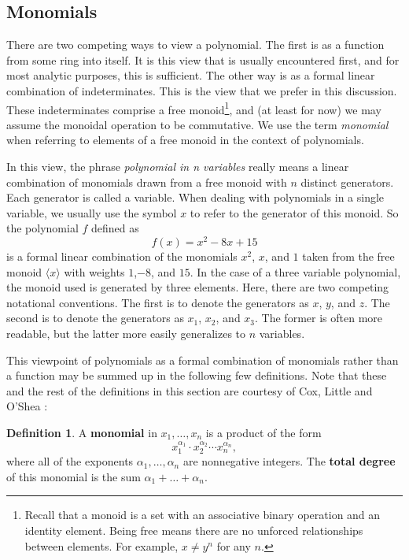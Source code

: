 \documentclass[MS, xcolor=dvipsnames]{wfuthesis}
\theoremstyle{definition}
\newtheorem{definition}[theorem]{Definition}
\begin{document}
\subsection{Monomials}
There are two competing ways to view a polynomial. The first is as a function from some ring into itself. It is this view that is usually encountered first, and for most analytic purposes, this is sufficient. The other way is as a formal linear combination of indeterminates. This is the view that we prefer in this discussion. These indeterminates comprise a free monoid\footnote{Recall that a monoid is a set with an associative binary operation and an identity element. Being free means there are no unforced relationships between elements. For example, $x \ne y^n$ for any $n$.}, and (at least for now) we may assume the monoidal operation to be commutative. We use the term \textit{monomial} when referring to elements of a free monoid in the context of polynomials. \par 
In this view, the phrase \textit{polynomial in n variables} really means a linear combination of monomials drawn from a free monoid with $n$ distinct generators. Each generator is called a variable. When dealing with polynomials in a single variable, we usually use the symbol $x$ to refer to the generator of this monoid. So the polynomial $f$ defined as 
\[ f(x) = x^2-8x+15 \]
is a formal linear combination of the monomials $x^2$, $x$, and $1$ taken from the free monoid $\langle x \rangle$ with weights $1$,$-8$, and $15$. In the case of a three variable polynomial, the monoid used is generated by three elements. Here, there are two competing notational conventions. The first is to denote the generators as $x$, $y$, and $z$. The second is to denote the generators as $x_1$, $x_2$, and $x_3$. The former is often more readable, but the latter more easily generalizes to $n$ variables. \par 
This viewpoint of polynomials as a formal combination of monomials rather than a function may be summed up in the following few definitions. Note that these and the rest of the definitions in this section are courtesy of Cox, Little and O'Shea \cite{Cox2015}: 
\begin{definition}
  A \textbf{monomial} in $x_1,\dots,x_n$ is a product of the form 
  \[ x_1^{\alpha_1} \cdot x_2^{\alpha_2} \cdots x_n^{\alpha_n}, \]
  where all of the exponents $\alpha_1,\dots,\alpha_n$ are nonnegative integers. The \textbf{total degree} of this monomial is the sum $\alpha_1 + \dots + \alpha_n$.
\end{definition}
\end{document}
